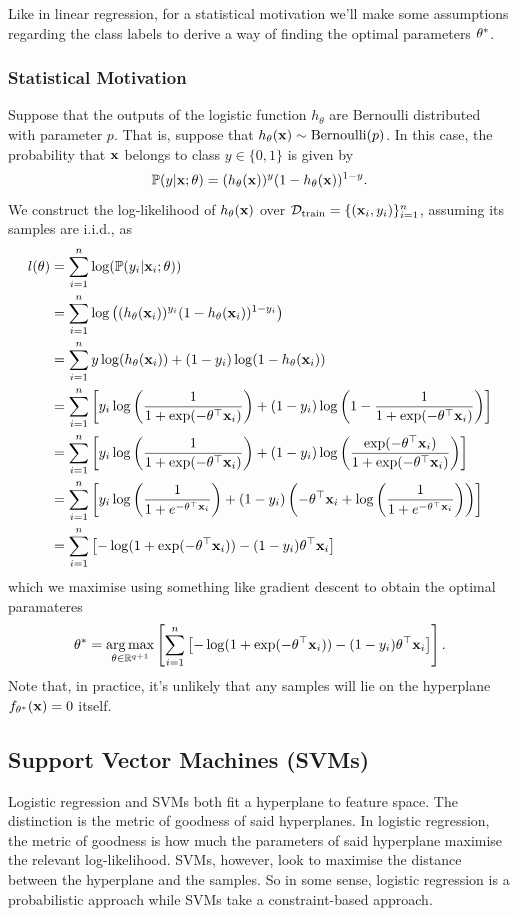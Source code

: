 \documentclass[11pt]{article}
\begin{document}
\noindent Like in linear regression, for a statistical motivation we'll make some assumptions regarding the class labels to derive a way of finding the optimal parameters $\theta^{*}$.

\subsubsection{Statistical Motivation}
Suppose that the outputs of the logistic function $h_{\theta}$ are Bernoulli distributed with parameter $p$. That is, suppose that $h_{\theta}(\mathbf{x})\sim\text{Bernoulli}(p)$. In this case, the probability that $\mathbf{x}$ belongs to class $y\in\{0, 1\}$ is given by
$$
\mathbb{P}(y|\mathbf{x};\theta)=(h_{\theta}(\mathbf{x}))^{y}(1-h_{\theta}(\mathbf{x}))^{1-y}.
$$
We construct the log-likelihood of $h_{\theta}(\mathbf{x})$ over $\mathcal{D}_{\text{train}}=\{(\mathbf{x}_i,y_i)\}_{i=1}^n$, assuming its samples are i.i.d., as
\begin{align*}
    l(\theta)
    &=
    \sum_{i=1}^n\log(\mathbb{P}(y_i|\mathbf{x}_i;\theta))\\
    &=
    \sum_{i=1}^n\log\left((h_{\theta}(\mathbf{x}_i))^{y_i}(1-h_{\theta}(\mathbf{x}_i))^{1-y_i}\right)\\
    &=
    \sum_{i=1}^ny\log(h_{\theta}(\mathbf{x}_i))+(1-y_i)\log(1-h_{\theta}(\mathbf{x}_i))\\
    &=
    \sum_{i=1}^n\left[y_i\log\left(\frac{1}{1+\exp(-\theta^{\top}\mathbf{x}_i)}\right)+(1-y_i)\log\left(1-\frac{1}{1+\exp(-\theta^{\top}\mathbf{x}_i)}\right)\right]\\
    &=
    \sum_{i=1}^n\left[y_i\log\left(\frac{1}{1+\exp(-\theta^{\top}\mathbf{x}_i)}\right)+(1-y_i)\log\left(\frac{\exp(-\theta^{\top}\mathbf{x}_i)}{1+\exp(-\theta^{\top}\mathbf{x}_i)}\right)\right]\\
    &=
    \sum_{i=1}^n\left[y_i\log\left(\frac{1}{1+e^{-\theta^{\top}\mathbf{x}_i}}\right)+(1-y_i)\left(-\theta^{\top}\mathbf{x}_i+\log\left(\frac{1}{1+e^{-\theta^{\top}\mathbf{x}_i}}\right)\right)\right]\\
    &=
    \sum_{i=1}^n\left[-\log(1+\exp(-\theta^{\top}\mathbf{x}_i))-(1-y_i)\theta^{\top}\mathbf{x}_i\right]
\end{align*}
which we maximise using something like gradient descent to obtain the optimal paramateres
$$
\theta^{*}
=
\operatorname*{arg\,max}_{\theta\in\mathbb{R}^{q+1}}\left[\sum_{i=1}^n\left[-\log(1+\exp(-\theta^{\top}\mathbf{x}_i))-(1-y_i)\theta^{\top}\mathbf{x}_i\right]\right].
$$
Note that, in practice, it's unlikely that any samples will lie on the hyperplane $f_{\theta^*}(\mathbf{x})=0$ itself.

\subsection{Support Vector Machines (SVMs)}
Logistic regression and SVMs both fit a hyperplane to feature space. The distinction is the metric of goodness of said hyperplanes. In logistic regression, the metric of goodness is how much the parameters of said hyperplane maximise the relevant log-likelihood. SVMs, however, look to maximise the distance between the hyperplane and the samples. So in some sense, logistic regression is a probabilistic approach while SVMs take a constraint-based approach.
\end{document}

